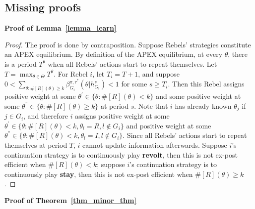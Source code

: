 \documentclass[12pt,letter]{article}
\newtheorem*{theorem*}{Theorem}
\newtheorem*{lemma*}{Lemma}
\theoremstyle{definition}
\theoremstyle{remark}
\theoremstyle{claim}
\begin{document}
\clearpage
\subsection{Missing proofs}
\noindent\textbf{Proof of Lemma~\ref{lemma_learn}}
\begin{proof}
The proof is done by contraposition. Suppose Rebels' strategies constitute an APEX equilibrium. By definition of the APEX equilibrium, at every $\theta$, there is a period $T^{\theta}$ when all Rebels' actions start to repeat themselves. Let $T=\max_{\theta\in \Theta}{T^{\theta}}$. For Rebel $i$, let $T_i=T+1$, and suppose $0<\sum_{\theta:\#[R](\theta)\geq k}\beta^{\pi,\tau^*}_{G_i}(\theta|h^{s}_{G_i})<1$ for some $s\geq T_i$. Then this Rebel assigns positive weight at some ${\theta^{'}}\in \{\theta:\#[R](\theta)< k\}$ and some positive weight at some ${\theta^{''}}\in \{\theta:\#[R](\theta)\geq k\}$ at period $s$. Note that $i$ has already known $\theta_j$ if $j\in G_i$, and therefore $i$ assigns positive weight at some $\theta^{'}\in \{\theta:\#[R](\theta)< k, \theta_l=R, l\notin G_i\}$ and positive weight at some $\theta^{''}\in \{\theta:\#[R](\theta)< k, \theta_l=I, l\notin G_i\}$. Since all Rebels' actions start to repeat themselves at period $T$, $i$ cannot update information afterwards. Suppose $i$'s continuation strategy is to continuously play \textbf{revolt}, then this is not ex-post efficient when $\#[R](\theta)< k$; suppose $i$'s continuation strategy is to continuously play \textbf{stay}, then this is not ex-post efficient when $\#[R](\theta)\geq k$.
\end{proof}
%
%
\bigskip
\noindent\textbf{Proof of Theorem~\ref{thm_minor_thm}}
\end{document}
